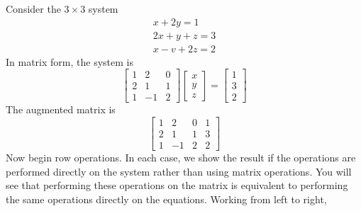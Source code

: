 \documentclass[../main.tex]{subfiles}
\begin{document}
\begin{example} Consider the $3 \times 3$ system
$$
\begin{array}{l}
x+2 y=1 \\
2 x+y+z=3 \\
x-v+2 z=2
\end{array}
$$
In matrix form, the system is
$$
\left[\begin{array}{ccc}
1 & 2 & 0 \\
2 & 1 & 1 \\
1 & -1 & 2
\end{array}\right]\left[\begin{array}{l}
x \\
y \\
z
\end{array}\right]=\left[\begin{array}{l}
1 \\
3 \\
2
\end{array}\right]
$$
The augmented matrix is
$$
\left[\begin{array}{ccc|c}
1 & 2 & 0 & 1 \\
2 & 1 & 1 & 3 \\
1 & -1 & 2 & 2
\end{array}\right]
$$
Now begin row operations. In each case, we show the result if the operations are performed directly on the system rather than using matrix operations. You will see that performing these operations on the matrix is equivalent to performing the same operations directly on the equations. Working from left to right,


\end{example}
\end{document}
